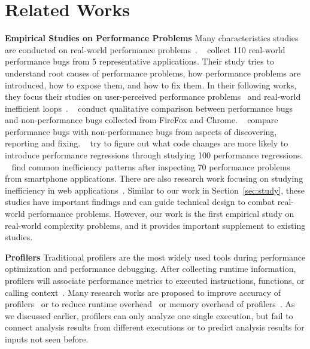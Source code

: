 
\section{Related Works}
\label{sec:related}

\noindent\textbf{Empirical Studies on Performance Problems}
Many characteristics studies are conducted on real-world performance 
problems~\cite{PerfBug,SongOOPSLA2014,ldoctor,Zaman2012MSR,Nistor2013MSR,HuangRegression,SmartphoneStudy,junwen-1, junwen-2}. 
~\citet{PerfBug} collect 110 real-world performance bugs from 5 representative applications.
Their study tries to understand root causes of performance problems,
how performance problems are introduced, how to expose them, and how to fix them.
In their following works, they focus their studies on 
user-perceived performance problems~\cite{SongOOPSLA2014} 
and real-world inefficient loops~\cite{ldoctor}. 
~\citet{Zaman2012MSR} conduct qualitative comparison between performance bugs 
and non-performance bugs collected from FireFox and Chrome. 
~\citet{Nistor2013MSR} compare performance bugs with non-performance bugs 
from aspects of discovering, reporting and fixing. 
~\citet{HuangRegression} try to figure out what code changes are more likely to introduce performance regressions through 
studying 100 performance regressions. 
~\citet{SmartphoneStudy} find common inefficiency patterns after 
inspecting 70 performance problems from smartphone applications. 
There are also research work focusing on studying inefficiency in web applications~\cite{junwen-1, junwen-2}. 
Similar to our work in Section~\ref{sec:study}, 
these studies have important findings and can guide technical design to combat 
real-world performance problems. 
However, our work is the first empirical study on real-world complexity problems, 
and it provides important supplement to existing studies. 

\noindent\textbf{Profilers}
Traditional profilers are the most widely used tools 
during performance optimization and performance debugging. 
After collecting runtime information, 
profilers will associate performance metrics to executed instructions, 
functions, or calling context~\cite{oprofile,gprof, CCT}.
Many research works are proposed to improve 
accuracy of profilers~\cite{4Profilers, LagHunter, AppInsight} or 
to reduce runtime overhead~\cite{AdaptiveBurst} 
or memory overhead of profilers~\cite{HotCallingContext}. 
As we discussed earlier, profilers can only analyze one single execution, 
but fail to connect analysis results from different executions 
or to predict analysis results for inputs not seen before.  

